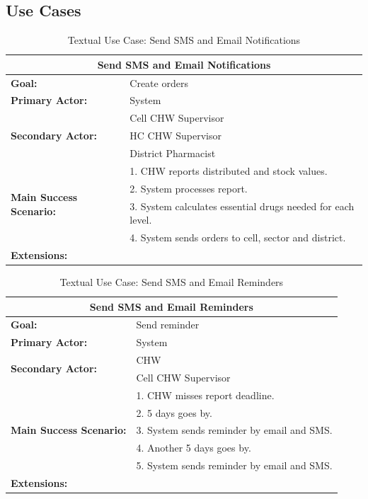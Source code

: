 \subsection{Use Cases}
\begin{table}[h]
	\centering
	\begin{tabular}{|p{5cm}|p{7cm}|}
		\hline
		\multicolumn{2}{|c|}{\textbf{Send SMS and Email Notifications}}\\
		\hline
		\textbf{Goal:} & Create orders\\
		\hline
		\textbf{Primary Actor:} & System\\
		\hline
		\multirow{3}{*}{\textbf{Secondary Actor:}}	& Cell CHW Supervisor \\
																								& HC CHW Supervisor \\ 
																								& District Pharmacist \\
		\hline
		\multirow{4}{*}{\textbf{Main Success Scenario:}}	& 1. CHW reports distributed and stock values. \\
																											& 2. System processes report. \\
																											& 3. System calculates essential drugs needed for each level. \\
																											& 4. System sends orders to cell, sector and district. \\
		\hline
		\textbf{Extensions:} & \\
		\hline
	\end{tabular}
	\caption{Textual Use Case: Send SMS and Email Notifications}
	\label{tab:notifications}
\end{table}


\begin{table}
	\centering
	\begin{tabular}{|p{5cm}|p{7cm}|}
		\hline
		\multicolumn{2}{|c|}{\textbf{Send SMS and Email Reminders}}\\
		\hline
		\textbf{Goal:} & Send reminder \\
		\hline
		\textbf{Primary Actor:} & System \\
		\hline
		\multirow{2}{*}{\textbf{Secondary Actor:}}	& CHW \\
																								& Cell CHW Supervisor \\
		\hline
		\multirow{5}{*}{\textbf{Main Success Scenario:}}	& 1. CHW misses report deadline. \\
																											& 2. 5 days goes by. \\
																											& 3. System sends reminder by email and SMS. \\
																											& 4. Another 5 days goes by. \\
																											& 5. System sends reminder by email and SMS. \\
																											
		\hline
		\textbf{Extensions:} & \\
		\hline
	\end{tabular}
	\caption{Textual Use Case: Send SMS and Email Reminders}
	\label{tab:reminders}
\end{table}



